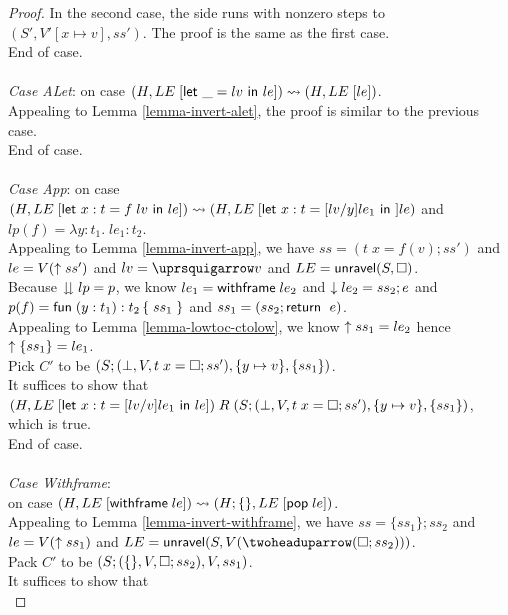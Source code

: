 \begin{proof}
  In the second case, the \cstar side runs with nonzero steps to $(S', V'[x\mapsto v], ss')$. The proof is the same as the first case. \\
  End of case. \\
  \\
  \emph{Case ALet}: on case $(H, \fplug{LE}{\elet{\_}{lv}{le}})\step(H, \fplug{LE}{le})$. \\
  Appealing to Lemma \ref{lemma-invert-alet}, the proof is similar to the previous case. \\
  End of case. \\
  \\
  \emph{Case App}: on case $(H, \fplug{LE}{\elet{x:t}{f\;lv}{le}})\step(H, \fplug{LE}{\elet{x:t}{\subst{y}{lv}{le_1}}}{le})$ and $lp(f)=\lambda y:t_1.\;le_1:t_2$. \\
  Appealing to Lemma \ref{lemma-invert-app}, we have $ss=(t\;x=f(v);ss')$ and $le=V(\ctolow{ss'})$ and $lv=\ctolowe{v}$ and $LE=\unravel(S, \symhole)$. \\
  Because $\lowtocd{lp}=p$, we know $le_1=\withframe\;le_2$ and $\lowtoc{le_2}=ss_2;e$ and $p(f)=\ecfuntwo{y}{t_1}{t_2}{ss_1}$ and $ss_1=(ss_2;\ereturn\;e)$. \\
  Appealing to Lemma \ref{lemma-lowtoc-ctolow}, we know $\ctolow{ss_1}=le_2$ hence $\ctolow{\{ss_1\}}=le_1$. \\
  Pick $C'$ to be $(S;(\None, V, t\;x=\symhole;ss'), \{y\mapsto v\}, \{ss_1\})$. \\
  It suffices to show that \\
  $(H, \fplug{LE}{\elet{x:t}{\subst{v}{lv}{le_1}}{le}})\;R\;(S;(\None, V, t\;x=\symhole;ss'), \{y\mapsto v\}, \{ss_1\})$, which is true. \\
  End of case. \\
  \\
  \emph{Case Withframe}: \\
  on case $(H, \fplug{LE}{\withframe\;le})\step(H;\{\}, \fplug{LE}{\epop\;le})$. \\
  Appealing to Lemma \ref{lemma-invert-withframe}, we have $ss=\{ss_1\};ss_2$ and $le=V(\ctolow{ss_1})$ and $LE=\unravel(S, V(\ctolowE{(\symhole;ss_2)}))$. \\
  Pack $C'$ to be $(S;(\{\}, V, \symhole;ss_2), V, ss_1)$. \\
  It suffices to show that \\

\end{proof}
